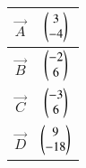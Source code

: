 \begin{tabular}{|c|c|}
\hline
$\vec{A}$ & $\begin{pmatrix}3\\-4\end{pmatrix}$\\
\hline
$\vec{B}$& $\begin{pmatrix}-2\\6\end{pmatrix}$\\
\hline
$\vec{C}$& $\begin{pmatrix}-3\\6\end{pmatrix}$\\
\hline
$\vec{D}$ & $\begin{pmatrix}9\\-18\end{pmatrix}$\\
\hline
\end{tabular}